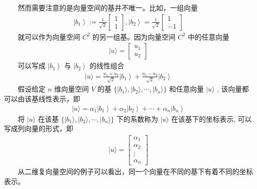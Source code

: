 \documentclass[a4paper,11pt,english]{sphinxmanual}
\begin{document}
\sphinxAtStartPar
​  然而需要注意的是向量空间的基并不唯一。比如，一组向量
\begin{equation*}
\begin{split}\left|b_{1}\right\rangle:=\frac{1}{\sqrt{2}}\left[\begin{array}{l}1 \\1\end{array}\right],\left|b_{2}\right\rangle=\frac{1}{\sqrt{2}}\left[\begin{array}{c}1 \\-1\end{array}\right]\end{split}
\end{equation*}
\sphinxAtStartPar
​  就可以作为向量空间  \(C^{2}\) 的另一组基。因为向量空间  \(C^{2}\) 中的任意向量
\begin{equation*}
\begin{split}|u\rangle=\left[\begin{array}{l} u_{1} \\ u_{2} \end{array}\right]\end{split}
\end{equation*}
\sphinxAtStartPar
​  可以写成  \(\left|b_{1}\right\rangle\) 与  \(\left|b_{2}\right\rangle\) 的线性组合
\begin{equation*}
\begin{split}|u\rangle=\frac{u_{1}+u_{2}}{\sqrt{2}}\left|b_{1}\right\rangle+\frac{u_{1}-u_{2}}{\sqrt{2}}\left|b_{2}\right\rangle\end{split}
\end{equation*}
\sphinxAtStartPar
​  假设给定  \(n\) 维向量空间  \(V\) 的基  \(\{|b_{1}\rangle,|b_{2}\rangle, \cdots,|b_{n}\rangle\}\) 和任意向量  \(|u\rangle\) , 该向量都可以由该基线性表示，即
\begin{equation*}
\begin{split}|u\rangle=\alpha_{1}\left|b_{1}\right\rangle+\alpha_{2}\left|b_{2}\right\rangle+\cdots+\alpha_{n}\left|b_{n}\right\rangle\end{split}
\end{equation*}
\sphinxAtStartPar
​  将  \(|u\rangle\) 在该基  \(\{|b_{1}\rangle,|b_{2}\rangle, \cdots,|b_{n}\rangle\}\) 下的系数称为  \(|u\rangle\) 在该基下的坐标表示, 可以写成列向量的形式，即
\begin{equation*}
\begin{split}|u\rangle=\left[\begin{array}{c} \alpha_{1} \\ \alpha_{2} \\ \vdots \\ \alpha_{n} \end{array}\right]\end{split}
\end{equation*}
\sphinxAtStartPar
​  从二维复向量空间的例子可以看出，同一个向量在不同的基下有着不同的坐标表示。
\end{document}
